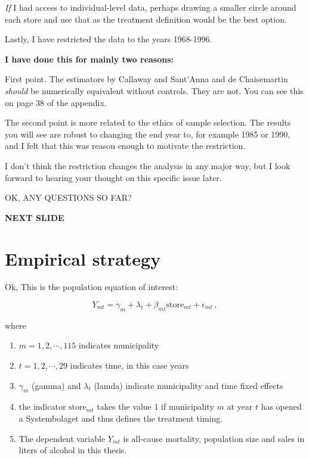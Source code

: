 \documentclass[12pt]{article}
\begin{document}
\emph{If}  I had access to individual-level data, perhaps drawing a smaller circle around each store and use that as the treatment definition would be the best option.

Lastly, I have restricted the data to the years 1968-1996. 

 \textbf{I have done this for mainly two reasons:} 

First point. The estimators by Callaway and Sant'Anna and de Chaisemartin \emph{should} be numerically equivalent without controls. They are not. You can see this on page 38 of the appendix.


The second point is more related to the ethics of sample selection.  The results you will see are robust to changing the end year to, for example 1985 or 1990, and I felt that this was reason enough to motivate the restriction. 

I don't think the restriction changes the analysis in any major way, but I look forward to hearing your thought on this specific issue later.


OK, ANY QUESTIONS SO FAR?

 \textbf{NEXT SLIDE}

 \section{Empirical strategy}

 Ok, This is the population equation of interest:

\begin{equation}
    Y_{mt} = \gamma_m + \lambda_t + \beta_{mt}  \text{store}_{mt} + \epsilon_{mt}\, ,
    \label{eq:pop-eq-of-interest}
\end{equation}

where 
\begin{enumerate}
    \item $m = 1,2,\cdots, 115$ indicates municipality
    \item $t = 1,2, \cdots, 29$ indicates time, in this case years
    \item $\gamma_m$ (gamma) and $\lambda_t$ (lamda) indicate municipality and time fixed effects
    \item the indicator $\text{store}_{mt}$ takes the value 1 if municipality $m$ at year $t$ has opened a Systembolaget and thus defines the treatment timing.
    \item The dependent variable $Y_{mt}$ is all-cause mortality, population size and sales in liters of alcohol in this thesis.
\end{enumerate}
\end{document}
